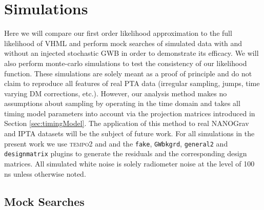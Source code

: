 \documentclass[iop]{emulateapj}
\begin{document}
\section{Simulations}
\label{sec:simulations}

Here we will compare our first order likelihood approximation to the full likelihood of VHML and perform mock searches of simulated data with and without an injected stochastic GWB in order to demonstrate its efficacy. We will also perform monte-carlo simulations to test the consistency of our likelihood function. These simulations are solely meant as a proof of principle and do not claim to reproduce all features of real PTA data (irregular sampling, jumps, time varying DM corrections, etc.). However, our analysis method makes no assumptions about sampling by operating in the time domain and takes all timing model parameters into account via the projection matrices introduced in Section \ref{sec:timingModel}. The application of this method to real NANOGrav and IPTA datasets will be the subject of future work. For all simulations in the present work we use  \textsc{tempo2} and and the \texttt{fake}, \texttt{GWbkgrd}, \texttt{general2} and \texttt{designmatrix} plugins to generate the residuals and the corresponding design matrices. All simulated white noise is solely radiometer noise at the level of 100 ns unless otherwise noted.

\subsection{Mock Searches}
\label{sec:mockSearch}
\end{document}

